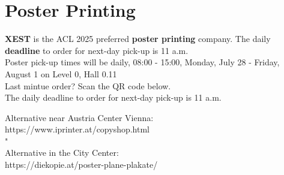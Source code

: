 \chapter{Poster Printing}
\vspace*{0.2cm}


\textbf{XEST} is the ACL 2025 preferred \textbf{poster printing} company. The daily \textbf{deadline} to order for next-day pick-up is 11 a.m.\\
 
Poster pick-up times will be daily, 08:00 - 15:00, Monday, July 28 - Friday, August 1 on Level 0, Hall 0.11\\



Last mintue order? Scan the QR code below.\\
The daily deadline to order for next-day pick-up is 11 a.m.



Alternative near Austria Center Vienna:\\
https://www.iprinter.at/copyshop.html	\\																								"
\\
Alternative in the City Center:\\
https://diekopie.at/poster-plane-plakate/\\
